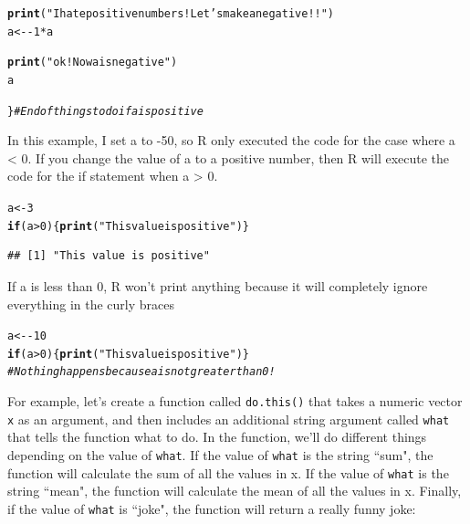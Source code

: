 \documentclass{tufte-book}\usepackage[]{graphicx}\usepackage[]{color}
\makeatletter
\newcommand{\hlnum}[1]{\textcolor[rgb]{0.686,0.059,0.569}{#1}}%
\newcommand{\hlstr}[1]{\textcolor[rgb]{0.192,0.494,0.8}{#1}}%
\newcommand{\hlcom}[1]{\textcolor[rgb]{0.678,0.584,0.686}{\textit{#1}}}%
\newcommand{\hlopt}[1]{\textcolor[rgb]{0,0,0}{#1}}%
\newcommand{\hlstd}[1]{\textcolor[rgb]{0.345,0.345,0.345}{#1}}%
\newcommand{\hlkwa}[1]{\textcolor[rgb]{0.161,0.373,0.58}{\textbf{#1}}}%
\newcommand{\hlkwb}[1]{\textcolor[rgb]{0.69,0.353,0.396}{#1}}%
\newcommand{\hlkwd}[1]{\textcolor[rgb]{0.737,0.353,0.396}{\textbf{#1}}}%
\newenvironment{kframe}{%
 \def\at@end@of@kframe{}%
 \ifinner\ifhmode%
  \def\at@end@of@kframe{\end{minipage}}%
  \begin{minipage}{\columnwidth}%
 \fi\fi%
 \def\FrameCommand##1{\hskip\@totalleftmargin \hskip-\fboxsep
 \colorbox{shadecolor}{##1}\hskip-\fboxsep
     \hskip-\linewidth \hskip-\@totalleftmargin \hskip\columnwidth}%
 \MakeFramed {\advance\hsize-\width
   \@totalleftmargin\z@ \linewidth\hsize
   \@setminipage}}%
 {\par\unskip\endMakeFramed%
 \at@end@of@kframe}
\newenvironment{knitrout}{}{} %
\makeatother
\begin{document}
\begin{footnotesize}
\begin{marginfigure}
\begin{tiny}
\begin{knitrout}
\begin{kframe}
\begin{alltt}
  \hlkwd{print}\hlstd{(}\hlstr{"I hate positive numbers! Let's make a negative!!"}\hlstd{)}
  \hlstd{a} \hlkwb{<-} \hlopt{-}\hlnum{1} \hlopt{*} \hlstd{a}

  \hlkwd{print}\hlstd{(}\hlstr{"ok! Now a is negative"}\hlstd{)}
  \hlstd{a}

\hlstd{\}} \hlcom{# End of things to do if a is positive}
\end{alltt}
\end{kframe}
\end{knitrout}
\end{tiny}

In this example, I set a to -50, so R only executed the code for the case where a < 0. If you change the value of a to a positive number, then R will execute the code for the if statement when a > 0.

\end{marginfigure}

\begin{knitrout}
\color{fgcolor}\begin{kframe}
\begin{alltt}
\hlstd{a} \hlkwb{<-} \hlnum{3}
\hlkwa{if}\hlstd{(a} \hlopt{>} \hlnum{0}\hlstd{) \{}\hlkwd{print}\hlstd{(}\hlstr{"This value is positive"}\hlstd{)\}}
\end{alltt}
\begin{verbatim}
## [1] "This value is positive"
\end{verbatim}
\end{kframe}
\end{knitrout}

If a is less than 0, R won't print anything because it will completely ignore everything in the curly braces

\begin{knitrout}
\color{fgcolor}\begin{kframe}
\begin{alltt}
\hlstd{a} \hlkwb{<-} \hlopt{-}\hlnum{10}
\hlkwa{if}\hlstd{(a} \hlopt{>} \hlnum{0}\hlstd{) \{}\hlkwd{print}\hlstd{(}\hlstr{"This value is positive"}\hlstd{)\}}
\hlcom{# Nothing happens because a is not greater than 0!}
\end{alltt}
\end{kframe}
\end{knitrout}


For example, let's create a function called \texttt{do.this()} that takes a numeric vector \texttt{x} as an argument, and then includes an additional string argument called \texttt{what} that tells the function what to do. In the function, we'll do different things depending on the value of \texttt{what}. If the value of \texttt{what} is the string ``sum", the function will calculate the sum of all the values in x. If the value of \texttt{what} is the string ``mean", the function will calculate the mean of all the values in x. Finally, if the value of \texttt{what} is ``joke", the function will return a really funny joke:


\end{footnotesize}
\end{document}
